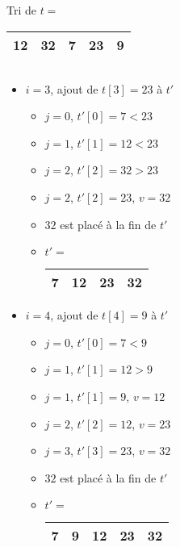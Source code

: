 \documentclass{beamer}
\begin{document}
{\begin{exampleblock}{Tri de $t =$ \begin{tabular}{|c|c|c|c|c|}
\hline
12 & 32 & 7 & 23 & 9 \\
\hline
\end{tabular}}
\begin{columns}
\begin{column}{6cm}
\begin{itemize}
  \item $i=3$, ajout de $t[3]=23$ à $t'$
  \begin{itemize}
    \item $j=0$, $t'[0]=7 < 23$
    \item $j=1$, $t'[1]=12 < 23$
    \item $j=2$, $t'[2]=32 > 23$
    \item $j=2$, $t'[2]=23$, $v=32$
    \item $32$ est placé à la fin de $t'$
    \item $t' =$ \begin{tabular}{|c|c|c|c|}
\hline
7 & 12 & 23 & 32 \\
\hline
\end{tabular}
  \end{itemize}
  \item $i=4$, ajout de $t[4]=9$ à $t'$
  \begin{itemize}
    \item $j=0$, $t'[0]=7 < 9$
    \item $j=1$, $t'[1]=12 > 9$
    \item $j=1$, $t'[1] = 9$, $v=12$
    \item $j=2$, $t'[2] = 12$, $v=23$
    \item $j=3$, $t'[3] = 23$, $v=32$
    \item $32$ est placé à la fin de $t'$
    \item $t' =$ \begin{tabular}{|c|c|c|c|c|}
\hline
7 & 9 & 12 & 23 & 32 \\
\hline
\end{tabular}
  \end{itemize}
\end{itemize}
\end{column}
\end{columns}

\end{exampleblock}

}
\end{document}
